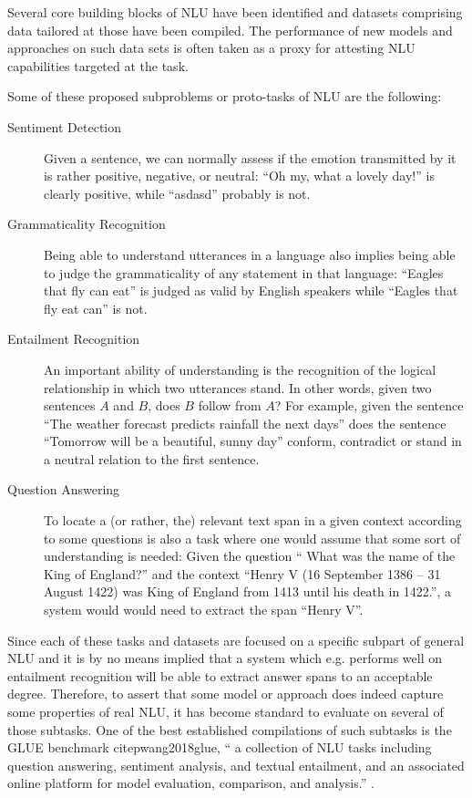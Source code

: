 Several core building blocks of NLU have been identified and datasets comprising data  tailored at those
have been compiled. The performance of new models and approaches on such data sets is often taken as
a proxy for attesting NLU capabilities targeted at the task.

Some of these proposed subproblems or proto-tasks of NLU are the following:

\begin{description}
  \item[Sentiment Detection] Given a sentence, we can normally assess if the emotion transmitted by
      it is rather positive, negative, or neutral: ``Oh my, what a lovely day!'' is clearly positive,
      while  ``asdasd'' probably is not.
  \item[Grammaticality Recognition] Being able to understand utterances in a language also implies
      being able to judge the grammaticality of any statement in that language: ``Eagles that fly can
      eat'' is judged as valid by English speakers while ``Eagles that fly eat can'' is not.
  \item[Entailment Recognition] An important ability of understanding is the recognition of the
      logical relationship in which two utterances stand. In other words, given two sentences $A$ and
      $B$, does $B$ follow from $A$? For example, given the sentence ``The weather forecast predicts
      rainfall the next days'' does the sentence ``Tomorrow will be a beautiful, sunny day'' conform,
      contradict or stand in a neutral relation to the first sentence.
  \item[Question Answering] To locate a (or rather, the) relevant text span in a given context according to some
      questions is also a task where one would assume that some sort of understanding is needed:
      Given the question `` What was the name of the King of England?'' and the context ``Henry
      V (16 September 1386 – 31 August 1422) was King of England from 1413 until his death in
      1422.'', a system would would need to extract the span ``Henry V''.
\end{description}

Since each of these tasks and datasets are focused on a specific subpart of general NLU and
it is by no means implied that a system which e.g. performs well on entailment recognition
will be able to extract answer spans to an acceptable degree. Therefore, to assert that some
model or approach does indeed capture some properties of real NLU, it has become standard
to evaluate on several of those subtasks. One of the best established compilations of such
subtasks is the GLUE benchmark citep{wang2018glue}, `` a collection of NLU tasks including
question answering, sentiment analysis, and textual entailment, and an associated online
platform for model evaluation, comparison, and analysis.'' \citep{wang2018glue}.

